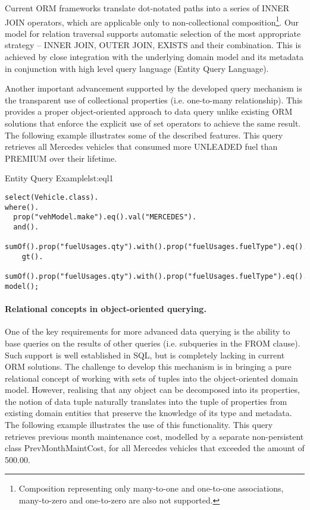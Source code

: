   Current ORM frameworks translate dot-notated paths into a series of INNER JOIN operators, which are applicable only to non-collectional composition\footnote{Composition representing only many-to-one and one-to-one associations, many-to-zero and one-to-zero are also not supported.}.
  Our model for relation traversal supports automatic selection of the most appropriate strategy -- INNER JOIN, OUTER JOIN, EXISTS and their combination.
  This is achieved by close integration with the underlying domain model and its metadata in conjunction with high level query language (Entity Query Language).
  
  Another important advancement supported by the developed query mechanism is the transparent use of collectional properties (i.e. one-to-many relationship).
  This provides a proper object-oriented approach to data query unlike existing ORM solutions that enforce the explicit use of set operators to achieve the same result.
  The following example illustrates some of the described features.  
  This query retrieves all Mercedes vehicles that consumed more UNLEADED fuel than PREMIUM over their lifetime.


  \begin{code}{Entity Query Example}{lst:eql1}
    \begin{lstlisting}
select(Vehicle.class).
where().
  prop("vehModel.make").eq().val("MERCEDES").
  and().
  sumOf().prop("fuelUsages.qty").with().prop("fuelUsages.fuelType").eq().val("UNLEADED").
    gt().
  sumOf().prop("fuelUsages.qty").with().prop("fuelUsages.fuelType").eq().val("PREMIUM").
model();
    \end{lstlisting}
   \end{code}

  \paragraph{Relational concepts in object-oriented querying.}
  One of the key requirements for more advanced data querying is the ability to base queries on the results of other queries (i.e. subqueries in the FROM clause).
  Such support is well established in SQL, but is completely lacking in current ORM solutions.
  The challenge to develop this mechanism is in bringing a pure relational concept of working with sets of tuples into the object-oriented domain model.
  However, realising that any object can be decomposed into its properties, the notion of data tuple naturally translates into the tuple of properties from existing domain entities that preserve the knowledge of its type and metadata.
  The following example illustrates the use of this functionality.
  This query retrieves previous month maintenance cost, modelled by a separate non-persistent class PrevMonthMaintCost, for all Mercedes vehicles that exceeded the amount of 500.00.
  
